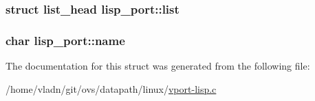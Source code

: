 \subsubsection[{list}]{\setlength{\rightskip}{0pt plus 5cm}struct list\+\_\+head lisp\+\_\+port\+::list}\label{structlisp__port_adaf751d0e165cfbf047be71e680c3f19}
\hypertarget{structlisp__port_ae0a7f15d977897e051bb338429f1d7fe}{}
\subsubsection[{name}]{\setlength{\rightskip}{0pt plus 5cm}char lisp\+\_\+port\+::name}\label{structlisp__port_ae0a7f15d977897e051bb338429f1d7fe}


The documentation for this struct was generated from the following file\+:\begin{DoxyCompactItemize}
\item 
/home/vladn/git/ovs/datapath/linux/\hyperlink{linux_2vport-lisp_8c}{vport-\/lisp.\+c}\end{DoxyCompactItemize}
